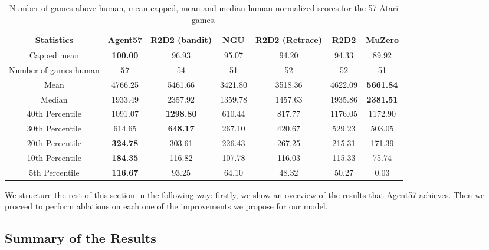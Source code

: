 \documentclass{article}
\begin{document}
\begin{table*}
\scriptsize
\centering
\caption{Number of games above human, mean capped, mean and median human normalized scores for the 57 Atari games.}
\vspace{1ex}
\begin{tabular}{|c|c|c|c|c|c|c|}
\hline
 Statistics & Agent57 & R2D2 (bandit) & NGU & R2D2 (Retrace) & R2D2 & MuZero \\
\hline
 Capped mean & \bf{100.00} & 96.93 & 95.07 & 94.20 & 94.33 & 89.92 \\
 Number of games  human & \bf{57} & 54 & 51 & 52 & 52 & 51 \\
 Mean & 4766.25 & 5461.66 & 3421.80 & 3518.36 & 4622.09 & \bf{5661.84} \\
 Median & 1933.49 & 2357.92 & 1359.78 & 1457.63 & 1935.86 & \bf{2381.51} \\
 40th Percentile & 1091.07 & \bf{1298.80} & 610.44 & 817.77 & 1176.05 & 1172.90 \\
 30th Percentile & 614.65 & \bf{648.17} & 267.10 & 420.67 & 529.23 & 503.05 \\
 20th Percentile & \bf{324.78} & 303.61 & 226.43 & 267.25 & 215.31 & 171.39 \\
 10th Percentile & \bf{184.35} & 116.82 & 107.78 & 116.03 & 115.33 & 75.74 \\
 5th Percentile & \bf{116.67} & 93.25 & 64.10 & 48.32 & 50.27 & 0.03 \\
\hline
\end{tabular}
\label{tab:normalizedscores}
\end{table*}

We structure the rest of this section in the following way: firstly, we show an overview of the results that Agent57 achieves. Then we proceed to perform ablations on each one of the improvements we propose for our model.


\subsection{Summary of the Results}
\label{subsec:summary}
\end{document}
